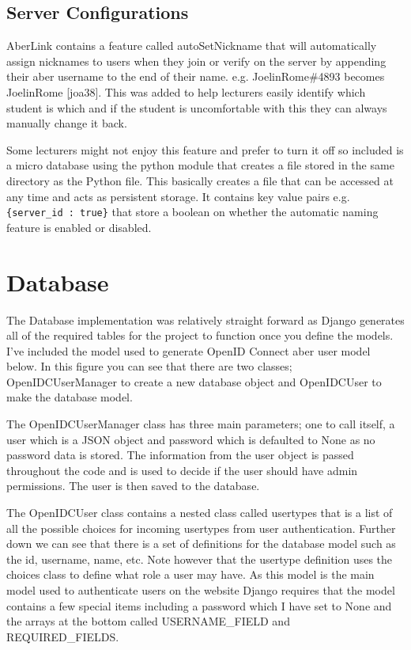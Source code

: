 \subsection{Server Configurations}\label{sec3:server-config}
AberLink contains a feature called autoSetNickname that will automatically assign nicknames to users when they join or verify on the server by appending their aber username to the end of their name. e.g. JoelinRome\#4893 becomes JoelinRome [joa38]. This was added to help lecturers easily identify which student is which and if the student is uncomfortable with this they can always manually change it back. 

Some lecturers might not enjoy this feature and prefer to turn it off so included is a micro database using the python module \cite{shelve} that creates a file stored in the same directory as the Python file. This basically creates a file that can be accessed at any time and acts as persistent storage. It contains key value pairs e.g. \verb|{server_id : true}| that store a boolean on whether the automatic naming feature is enabled or disabled. 

\section{Database}\label{sec3:database}
The Database implementation was relatively straight forward as Django \cite{Django} generates all of the required tables for the project to function once you define the models. I've included the model used to generate OpenID Connect \cite{OpenID} aber user model below. In this figure you can see that there are two classes; OpenIDCUserManager to create a new database object and OpenIDCUser to make the database model. 

The OpenIDCUserManager class has three main parameters; one to call itself, a user which is a JSON object and password which is defaulted to None as no password data is stored. The information from the user object is passed throughout the code and is used to decide if the user should have admin permissions. The user is then saved to the database.

The OpenIDCUser class contains a nested class called usertypes that is a list of all the possible choices for incoming usertypes from user authentication. Further down we can see that there is a set of definitions for the database model such as the id, username, name, etc. Note however that the usertype definition uses the choices class to define what role a user may have. As this model is the main model used to authenticate users on the website Django requires that the model contains a few special items including a password which I have set to None and the arrays at the bottom called USERNAME\_FIELD and REQUIRED\_FIELDS.

